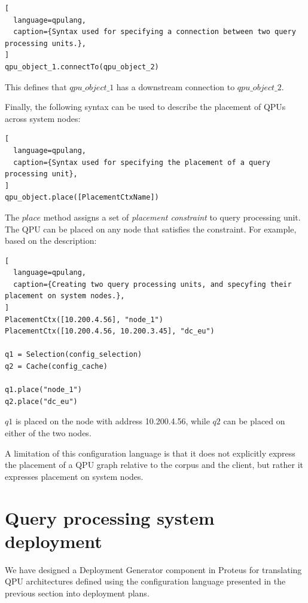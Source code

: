 \begin{lstlisting}[
  language=qpulang,
  caption={Syntax used for specifying a connection between two query processing units.},
]
qpu_object_1.connectTo(qpu_object_2)
\end{lstlisting}

\noindent
This defines that $qpu\_object\_1$ has a downstream connection to $qpu\_object\_2$.

\medskip
\noindent
Finally, the following syntax can be used to describe the placement of QPUs across system nodes:

\begin{lstlisting}[
  language=qpulang,
  caption={Syntax used for specifying the placement of a query processing unit},
]
qpu_object.place([PlacementCtxName])
\end{lstlisting}

\noindent
The $place$ method assigns a set of \textit{placement constraint} to query processing unit.
The QPU can be placed on any node that satisfies the constraint.
For example, based on the description:

\begin{lstlisting}[
  language=qpulang,
  caption={Creating two query processing units, and specyfing their placement on system nodes.},
]
PlacementCtx([10.200.4.56], "node_1")
PlacementCtx([10.200.4.56, 10.200.3.45], "dc_eu")

q1 = Selection(config_selection)
q2 = Cache(config_cache)

q1.place("node_1")
q2.place("dc_eu")
\end{lstlisting}

\noindent
$q1$ is placed on the node with address 10.200.4.56,
while $q2$ can be placed on either of the two nodes.

\bigskip
\noindent

A limitation of this configuration language is that it does not explicitly express the placement of a QPU graph
relative to the corpus and the client,
but rather it expresses placement on system nodes.


\section{Query processing system deployment}
\label{sec:proteus_deployment}

We have designed a Deployment Generator component in Proteus for translating QPU architectures defined using the configuration
language presented in the previous section into deployment plans.

